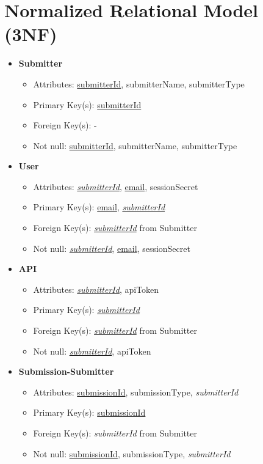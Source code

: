 \documentclass{article}
\begin{document}
\section{Normalized Relational Model (3NF)}
    \begin{itemize}
        \item \textbf{Submitter}        
        \begin{itemize}
            \item Attributes: \underline{submitterId}, submitterName, submitterType
            \item Primary Key(s): \underline{submitterId}
            \item Foreign Key(s): -
            \item Not null: \underline{submitterId}, submitterName, submitterType
        \end{itemize}

        \item \textbf{User}
        \begin{itemize}
            \item Attributes: \underline{\textit{submitterId}}, \underline{email}, sessionSecret
            \item Primary Key(s): \underline{email}, \underline{\textit{submitterId}}
            \item Foreign Key(s): \underline{\textit{submitterId}} from Submitter
            \item Not null: \underline{\textit{submitterId}}, \underline{email}, sessionSecret
        \end{itemize}

        \item \textbf{API}
        \begin{itemize}
            \item Attributes: \underline{\textit{submitterId}}, apiToken
            \item Primary Key(s): \underline{\textit{submitterId}}
            \item Foreign Key(s): \underline{\textit{submitterId}} from Submitter
            \item Not null: \underline{\textit{submitterId}}, apiToken
        \end{itemize}

        \item \textbf{Submission-Submitter}
        \begin{itemize}
            \item Attributes: \underline{submissionId}, submissionType, \textit{submitterId}
            \item Primary Key(s): \underline{submissionId}
            \item Foreign Key(s): \textit{submitterId} from Submitter
            \item Not null: \underline{submissionId}, submissionType, \textit{submitterId}
        \end{itemize}


\end{itemize}
\end{document}
